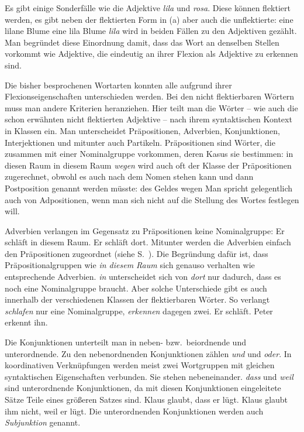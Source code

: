 \documentclass[ number=45
			   ,series=eotms
			   ,printondemand
			  ]{langsci}
\begin{document}
{Es gibt einige Sonderfälle wie \zb die Adjektive \emph{lila} und \emph{rosa}. Diese können flektiert
werden, es gibt neben der flektierten Form in (a) aber auch die unflektierte:
\eal
\ex eine lilane Blume
\ex eine lila Blume
\zl
\emph{lila} wird in beiden Fällen zu den Adjektiven gezählt. Man begründet diese Einordnung damit,
dass das Wort an denselben Stellen vorkommt wie Adjektive, die eindeutig an ihrer Flexion als
Adjektive zu erkennen sind.


Die bisher besprochenen Wortarten konnten alle aufgrund ihrer Flexionseigenschaften unterschieden
werden. Bei den nicht flektierbaren Wörtern muss man andere Kriterien heranziehen. Hier teilt man
die Wörter -- wie auch die schon erwähnten nicht flektierten Adjektive -- nach ihrem syntaktischen
Kontext in Klassen ein. Man unterscheidet Präpositionen, Adverbien,
Konjunktionen, Interjektionen und mitunter auch Partikeln.
Präpositionen sind Wörter, die zusammen mit einer Nominalgruppe vorkommen, deren Kasus sie
bestimmen:
\eal
\ex in diesen Raum
\ex in diesem Raum
\zl
\emph{wegen} wird auch oft der Klasse der Präpositionen zugerechnet, obwohl es auch nach dem Nomen
stehen kann und dann Postposition genannt werden müsste:
\ea
des Geldes wegen
\z
Man spricht gelegentlich auch von Adpositionen, wenn man sich nicht auf die Stellung des Wortes
festlegen will.

Adverbien verlangen im Gegensatz zu Präpositionen keine Nominalgruppe:
\eal
\ex Er schläft in diesem Raum.
\ex Er schläft dort.
\zl
Mitunter werden die Adverbien einfach den Präpositionen zugeordnet (siehe S.~\pageref{Seite-Adverbien-PP}). Die Begründung dafür ist, dass
Präpositionalgruppen wie \emph{in diesem Raum} sich genauso verhalten wie entsprechende
Adverbien. \emph{in} unterscheidet sich von \emph{dort} nur dadurch, dass es noch eine Nominalgruppe
braucht. Aber solche Unterschiede gibt es auch innerhalb der verschiedenen Klassen der flektierbaren
Wörter. So verlangt \emph{schlafen} nur eine Nominalgruppe, \emph{erkennen} dagegen zwei.
\eal
\ex Er schläft.
\ex Peter erkennt ihn.
\zl

\noindent
Die Konjunktionen unterteilt man in neben- bzw.\ beiordnende und unterordnende. Zu den nebenordnenden Konjunktionen
zählen \emph{und} und \emph{oder}. In koordinativen Verknüpfungen werden meist zwei Wortgruppen mit
gleichen syntaktischen Eigenschaften verbunden. Sie stehen nebeneinander. \emph{dass} und
\emph{weil} sind unterordnende Konjunktionen, da mit diesen Konjunktionen eingeleitete Sätze Teile
eines größeren Satzes sind.
\eal
\ex Klaus glaubt, dass er lügt.
\ex Klaus glaubt ihm nicht, weil er lügt.
\zl
Die unterordnenden Konjunktionen werden auch \emph{Subjunktion} genannt.

}
\end{document}
